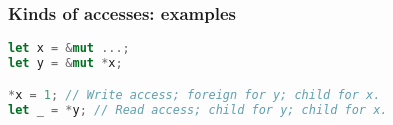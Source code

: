 \begin{frame}[fragile]
    \frametitle{Kinds of accesses: examples}
    \begin{block}{}
        \begin{lstlisting}[language=rust]
let x = &mut ...;
let y = &mut *x;

*x = 1; // Write access; foreign for y; child for x.
let _ = *y; // Read access; child for y; child for x.
        \end{lstlisting}
    \end{block}
    \begin{block}{}
        \centering
    \end{block}
\end{frame}
